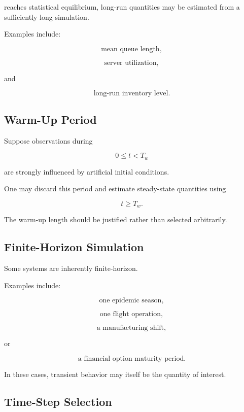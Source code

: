 reaches statistical equilibrium, long-run quantities may be estimated from
a sufficiently long simulation.

Examples include:

\[
\boxed{
\text{mean queue length},
}
\]

\[
\boxed{
\text{server utilization},
}
\]

and

\[
\boxed{
\text{long-run inventory level}.
}
\]

\subsection{Warm-Up Period}
\label{subsec:simulation-warmup-period}

Suppose observations during

\[
0\leq t<T_w
\]

are strongly influenced by artificial initial conditions.

One may discard this period and estimate steady-state quantities using

\[
\boxed{
t\geq T_w.
}
\]

The warm-up length should be justified rather than selected arbitrarily.

\subsection{Finite-Horizon Simulation}
\label{subsec:finite-horizon-simulation}

Some systems are inherently finite-horizon.

Examples include:

\[
\boxed{
\text{one epidemic season},
}
\]

\[
\boxed{
\text{one flight operation},
}
\]

\[
\boxed{
\text{a manufacturing shift},
}
\]

or

\[
\boxed{
\text{a financial option maturity period}.
}
\]

In these cases, transient behavior may itself be the quantity of interest.

\subsection{Time-Step Selection}
\label{subsec:simulation-time-step-selection}

